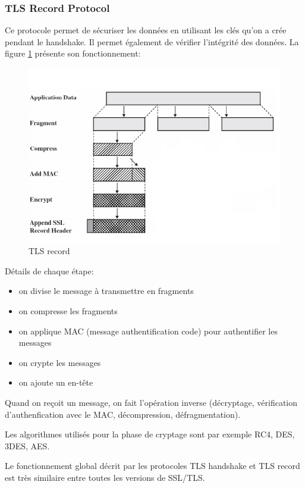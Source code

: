 \subsubsection{TLS Record Protocol}


Ce protocole permet de sécuriser les données en utilisant les clés qu'on a crée pendant le handshake. Il permet également de vérifier l'intégrité des données. La figure \ref{record} présente son fonctionnement:
\begin{figure}[H]
\centering
\includegraphics[scale=0.7]{img/tls-record.png}
\caption{TLS record}
\label{record}
\end{figure}

Détails de chaque étape:
\begin{itemize}
\item on divise le message à transmettre en fragments 
\item on compresse les fragments
\item on applique MAC (message authentification code) pour authentifier les messages 
\item on crypte les messages
\item on ajoute un en-t\^ete
\end{itemize}
Quand on reçoit un message, on fait l'opération inverse (décryptage, vérification d'authenfication avec le MAC, décompression, défragmentation). 

Les algorithmes utilisés pour la phase de cryptage sont par exemple RC4, DES, 3DES, AES. 

Le fonctionnement global décrit par les protocoles TLS handshake et TLS record est très similaire entre toutes les versions de SSL/TLS. 


